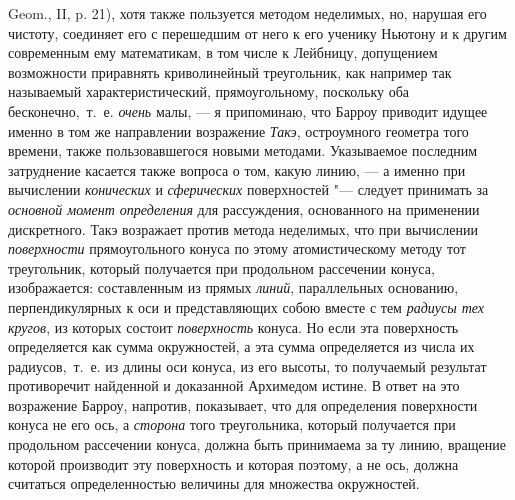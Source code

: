 Geom., II, p. 21), хотя также пользуется методом неделимых, но, нарушая его
чистоту, соединяет его с перешедшим от него к его ученику Ньютону и к
другим современным ему математикам, в том числе к Лейбницу, допущением
возможности приравнять криволинейный треугольник, как например так
называемый характеристический, прямоугольному, поскольку оба
бесконечно,~т.~е. {\em очень} малы, — я припоминаю, что
Барроу приводит идущее именно в том же направлении возражение
{\em Такэ}, остроумного геометра того времени, также
пользовавшегося новыми методами. Указываемое последним затруднение касается
также вопроса о том, какую линию, — а именно при вычислении
{\em конических} и
{\em сферических} поверхностей "--- следует принимать за
{\em основной момент определения} для рассуждения,
основанного на применении дискретного. Такэ возражает против метода
неделимых, что при вычислении {\em поверхности}
прямоугольного конуса по этому атомистическому методу тот треугольник,
который получается при продольном рассечении конуса, изображается:
составленным из прямых {\em линий}, параллельных
основанию, перпендикулярных к оси и представляющих собою вместе с тем
{\em радиусы тех кругов}, из которых состоит
{\em поверхность }конуса. Но если эта поверхность
определяется как сумма окружностей, а эта сумма определяется из числа их
радиусов,~т.~е. из длины оси конуса, из его высоты, то получаемый результат
противоречит найденной и доказанной Архимедом истине. В ответ на это
возражение Барроу, напротив, показывает, что для определения поверхности
конуса не его ось, а {\em сторона} того треугольника,
который получается при продольном рассечении конуса, должна быть принимаема
за ту линию, вращение которой производит эту поверхность и которая поэтому,
а не ось, должна считаться определенностью величины для множества
окружностей.

